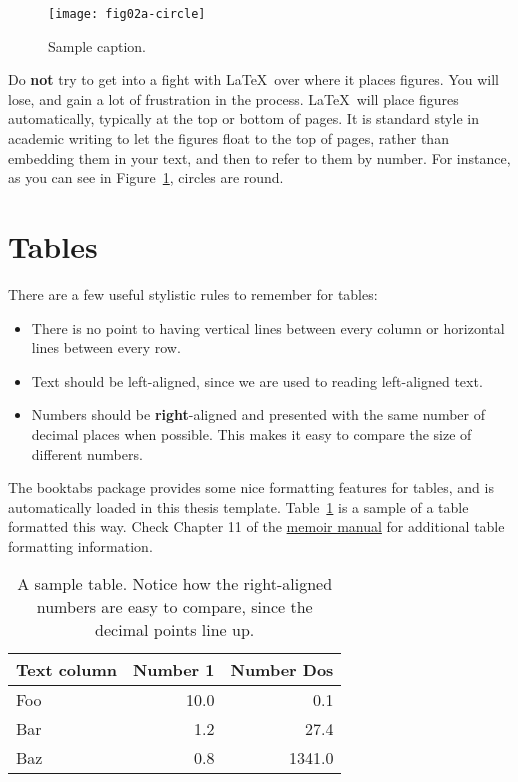 \begin{figure}
  \centering
  \texttt{[image: fig02a-circle]}
  \caption[Short caption for LoF]{Sample caption.}
  \label{label}
\end{figure}

Do \textbf{not} try to get into a fight with \LaTeX\ over where it places
figures. You will lose, and gain a lot of frustration in the process. \LaTeX\
will place figures automatically, typically at the top or bottom of pages. It is
standard style in academic writing to let the figures float to the top of pages,
rather than embedding them in your text, and then to refer to them by number.
For instance, as you can see in Figure~\ref{label}, circles are round.

\section{Tables}

There are a few useful stylistic rules to remember for tables:
\begin{itemize}
\item There is no point to having vertical lines between every column or
  horizontal lines between every row.
\item Text should be left-aligned, since we are used to reading left-aligned
  text.
\item Numbers should be \textbf{right}-aligned and presented with the same
  number of decimal places when possible. This makes it easy to compare the size
  of different numbers.
\end{itemize}

The booktabs package provides some nice formatting features for tables, and is
automatically loaded in this thesis template. Table~\ref{sample-table} is a
sample of a table formatted this way. Check Chapter 11 of the
\href{http://mirrors.ctan.org/macros/latex/contrib/memoir/memman.pdf}{memoir
    manual} for additional table formatting information.

\begin{table}
  \centering
  \begin{tabular}{l r r}\toprule
    Text column & Number 1 & Number Dos \\\midrule
    Foo & 10.0 & 0.1 \\
    Bar & 1.2 & 27.4 \\
    Baz & 0.8 & 1341.0 \\\bottomrule
  \end{tabular}
  \caption[Demonstration booktabs table]{A sample table. Notice how the
    right-aligned numbers are easy to compare, since the decimal points line
    up.}
  \label{sample-table}
\end{table}


